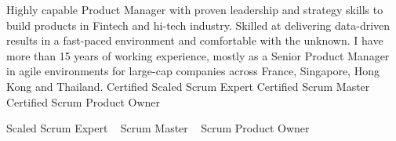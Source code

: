 

\begin{cvparagraph}


Highly capable Product Manager with proven leadership and strategy skills to build products in Fintech and hi-tech industry. Skilled at delivering data-driven results in a fast-paced environment and comfortable with the unknown. I have more than 15 years of working experience, mostly as a Senior Product Manager in agile environments for large-cap companies across France, Singapore, Hong Kong and Thailand.
\newline
\newline
Certified Scaled Scrum Expert
\newline
Certified Scrum Master
\newline
Certified Scrum Product Owner

\end{cvparagraph}
\begin{cvtechnologies}
 \Certified Scaled Scrum Expert  ~
 \Certified Scrum Master ~
 \Certified Scrum Product Owner ~
\end{cvtechnologies}
